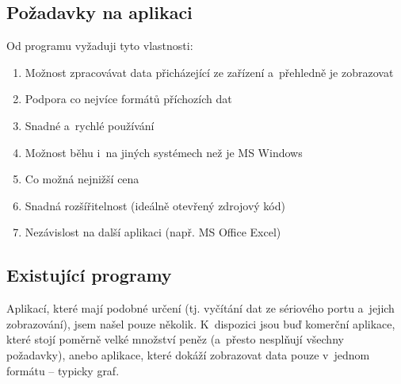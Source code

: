\documentclass[12pt, a4paper, oneside]{article}
\begin{document}
\subsection{Požadavky na aplikaci}
\label{reqs}
Od programu vyžaduji tyto vlastnosti:
\begin{enumerate}
    \item Možnost zpracovávat data přicházející ze zařízení a~přehledně je zobrazovat %
    \item Podpora co nejvíce formátů příchozích dat %
    \item Snadné a~rychlé používání %
    \item Možnost běhu i~na jiných systémech než je MS Windows %
    \item Co možná nejnižší cena %
    \item Snadná rozšířitelnost (ideálně otevřený zdrojový kód) %
    \item Nezávislost na další aplikaci (např. MS Office Excel) %
\end{enumerate}

\newpage
\subsection{Existující programy}
Aplikací, které mají podobné určení (tj. vyčítání dat ze sériového portu a~jejich zobrazování), jsem našel pouze několik. K~dispozici jsou buď komerční aplikace, které stojí poměrně velké množství peněz (a~přesto nesplňují všechny požadavky), anebo aplikace, které dokáží zobrazovat data pouze v~jednom formátu -- typicky graf.
\end{document}
